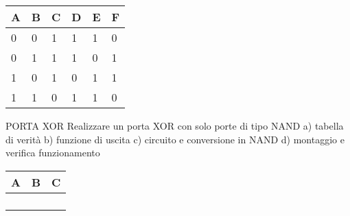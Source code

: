 \begin{center}
	\begin{tabular}{llllll}
	\toprule
		A & B & C & D & E & F \\
	\midrule
		0 & 0 & 1 & 1 & 1 & 0 \\
		0 & 1 & 1 & 1 & 0 & 1 \\
		1 & 0 & 1 & 0 & 1 & 1 \\
		1 & 1 & 0 & 1 & 1 & 0 \\
	\bottomrule
	\end{tabular}
\end{center}

PORTA XOR
Realizzare un porta XOR con solo porte di tipo NAND
a) tabella di verità
b) funzione di uscita
c) circuito e conversione in NAND
d) montaggio e verifica funzionamento







\begin{center}
	\begin{tabular}{lll}
	\toprule
		A & B & C \\
	\midrule
		& & \\
		& & \\
		& & \\
		& & \\
	\bottomrule
	\end{tabular}
\end{center}



